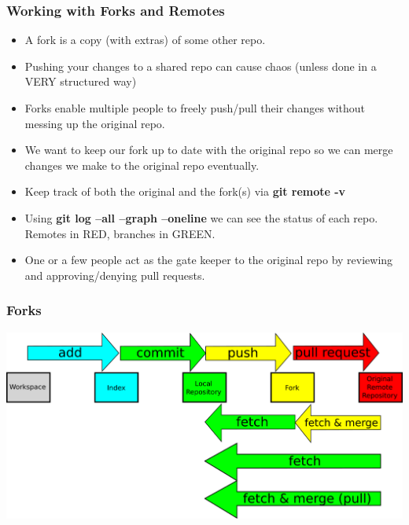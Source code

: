 \documentclass{beamer}
\begin{document}
\begin{frame}[fragile]
	\frametitle{Working with Forks and Remotes}
	\begin{itemize}
		\item A fork is a copy (with extras) of some other repo.
		\item Pushing your changes to a shared repo can cause chaos (unless done in a VERY structured way)
		\item Forks enable multiple people to freely push/pull their changes without messing up the original repo.
		\item We want to keep our fork up to date with the original repo so we can merge changes we make to the original repo eventually. 
		\item Keep track of both the original and the fork(s) via \textbf{git remote -v}
		\item Using \textbf{git log --all --graph --oneline} we can see the status of each repo. Remotes in RED, branches in GREEN.
		\item One or a few people act as the gate keeper to the original repo by reviewing and approving/denying pull requests.
	\end{itemize}
\end{frame}

\begin{frame}
	\frametitle{\textbf{Forks}}
	\begin{center}
		\includegraphics[width=\textwidth]{forks.png}
	\end{center}
\end{frame}	
\end{document}
